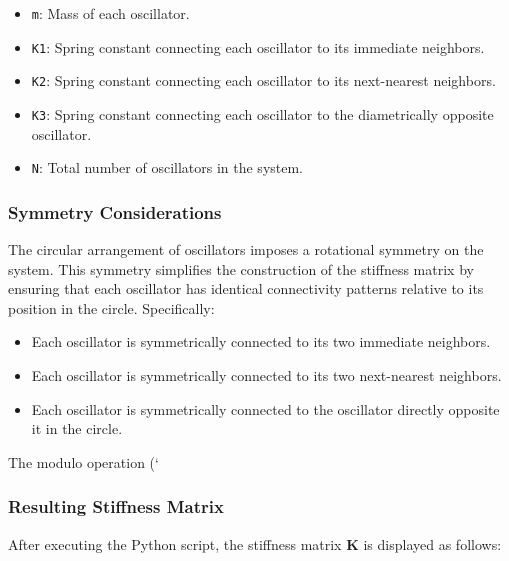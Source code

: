 \documentclass[12pt]{report} %
\begin{document}
    \begin{itemize}
        \item \texttt{m}: Mass of each oscillator.
        \item \texttt{K1}: Spring constant connecting each oscillator to its immediate neighbors.
        \item \texttt{K2}: Spring constant connecting each oscillator to its next-nearest neighbors.
        \item \texttt{K3}: Spring constant connecting each oscillator to the diametrically opposite oscillator.
        \item \texttt{N}: Total number of oscillators in the system.
    \end{itemize}
    
    \subsubsection{Symmetry Considerations}
    \label{subsubsec:part2_task1_symmetry}
    
    The circular arrangement of oscillators imposes a rotational symmetry on the system. This symmetry simplifies the construction of the stiffness matrix by ensuring that each oscillator has identical connectivity patterns relative to its position in the circle. Specifically:
    
    \begin{itemize}
        \item Each oscillator is symmetrically connected to its two immediate neighbors.
        \item Each oscillator is symmetrically connected to its two next-nearest neighbors.
        \item Each oscillator is symmetrically connected to the oscillator directly opposite it in the circle.
    \end{itemize}
    
    The modulo operation (`%
    
    \subsubsection{Resulting Stiffness Matrix}
    \label{subsubsec:part2_task1_K_matrix_result}
    
    After executing the Python script, the stiffness matrix \( \mathbf{K} \) is displayed as follows:
    
\end{document}
